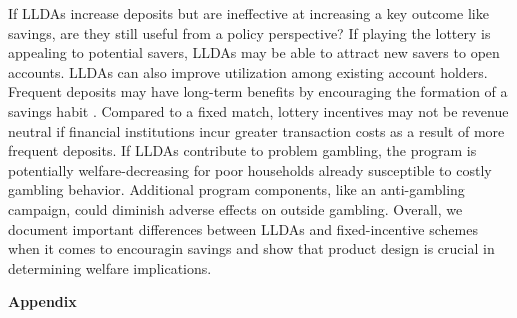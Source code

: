 \documentclass[12pt]{article}
\begin{document}
		If LLDAs increase deposits but are ineffective at increasing a key outcome like savings, are they still useful from a policy perspective? If playing the lottery is appealing to potential savers, LLDAs may be able to attract new savers to open  accounts. LLDAs can also improve utilization among existing account holders. Frequent deposits may have long-term benefits by encouraging the formation of a savings habit . Compared to a fixed match, lottery incentives may not be revenue neutral if financial institutions incur greater transaction costs as a result of more frequent deposits. If LLDAs contribute to problem gambling, the program is potentially welfare-decreasing for poor households already susceptible to costly gambling behavior. Additional program components, like an anti-gambling campaign, could diminish adverse effects on outside gambling. Overall, we document important differences between LLDAs and fixed-incentive schemes when it comes to encouragin savings and show that product design is crucial in determining welfare implications.





\newpage

\textbf{Appendix}

	
	
	
	
	
	
	

	\clearpage
\end{document}
